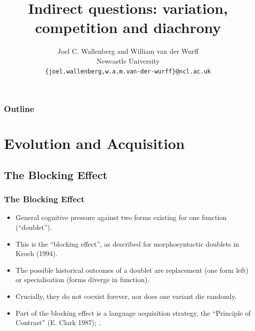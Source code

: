 \documentclass[hyperref={pdfpagelabels=false}]{beamer}
\title{Indirect questions: variation, competition and diachrony}
\author{Joel C. Wallenberg and William van der Wurff\\Newcastle University\\
    \texttt{\{joel.wallenberg,w.a.m.van-der-wurff\}@ncl.ac.uk}}
\institute{}
\begin{document}
\begin{frame}[plain]
\titlepage
\end{frame}

\begin{frame}
\frametitle{Outline}
\tableofcontents
\end{frame}


\section{Evolution and Acquisition}
\subsection{The Blocking Effect}
\begin{frame}
\frametitle{The Blocking Effect}
\begin{itemize}
	\item General cognitive pressure against two forms existing for one function (``doublet''). 
	\item This is the ``blocking effect'', as described for morphosyntactic doublets in Kroch (1994).\nocite{kroch1994}
	\item The possible historical outcomes of a doublet are replacement (one form left) or specialisation (forms diverge in function).
	\item Crucially, they do not coexist forever, nor does one variant die randomly.
	\item Part of the blocking effect is a language acquisition strategy, the ``Principle of Contrast'' (E. Clark 1987); \citep[cf. also][and references therein]{clark1990}. \nocite{clark1987}
\end{itemize}
\end{frame}
\end{document}
